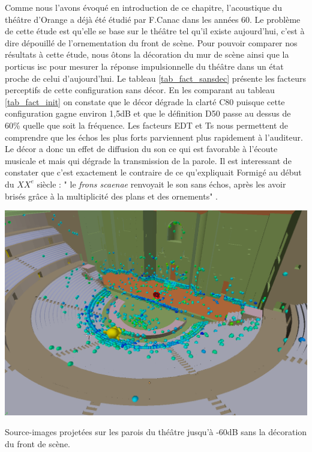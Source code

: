 Comme nous l'avons évoqué en introduction de ce chapitre, l'acoustique du théâtre d'Orange a déjà été étudié par F.Canac dans les années 60. Le problème de cette étude est qu'elle se base sur le théâtre tel qu'il existe aujourd'hui, c'est à dire dépouillé de l'ornementation du front de scène. Pour pouvoir comparer nos résultats à cette étude, nous ôtons la décoration du mur de scène ainsi que la \gls{porticus isc} pour mesurer la réponse impulsionnelle du théâtre dans un état proche de celui d'aujourd'hui. Le tableau \ref{tab_fact_sansdec} présente les facteurs perceptifs de cette configuration sans décor. En les comparant au tableau \ref{tab_fact_init} on constate que le décor dégrade la clarté  \gls{C80} puisque cette configuration gagne environ 1,5dB et que le définition \gls{D50} passe au dessus de 60\% quelle que soit la fréquence. Les facteurs \gls{EDT} et \gls{Ts} nous permettent de comprendre que les échos les plus forts parviennent plus rapidement à l'auditeur. Le décor a donc un effet de diffusion du son ce qui est favorable à l'écoute musicale et mais qui dégrade la transmission de la parole. Il est interessant de constater que c'est exactement le contraire de ce qu'expliquait Formigé au début du $XX^e$ siècle : " le \textit{frons scaenae} renvoyait le son sans échos, après les avoir brisés grâce à la multiplicité des plans et des ornements" \cite[p.43]{formige}.

\begin{figureth}
	\includegraphics[width=\linewidth]{images/SIsansDec}
	\caption{Source-images projetées sur les parois du théâtre jusqu'à -60dB sans la décoration du front de scène.}
	\label{SIsansDec}
\end{figureth}

